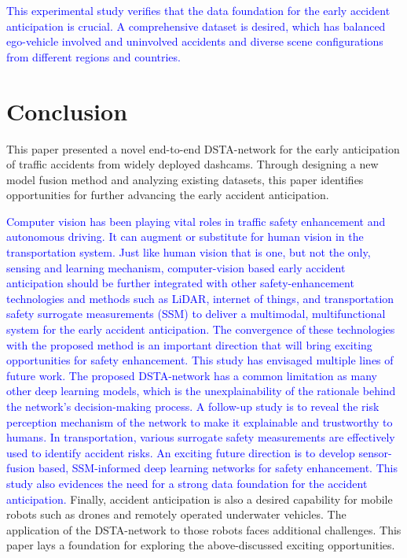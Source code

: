 \documentclass[journal]{IEEEtran}
\begin{document}
\textcolor{blue}{This experimental study verifies that the data foundation for the early accident anticipation is crucial. A comprehensive dataset is desired, which has balanced ego-vehicle involved and uninvolved accidents and diverse scene configurations from different regions and countries.}

\section{Conclusion}

This paper presented a novel end-to-end DSTA-network for the early anticipation of traffic accidents from widely deployed dashcams. Through designing a new model fusion method and analyzing existing datasets, this paper identifies opportunities for further advancing the early accident anticipation. 

\textcolor{blue}{Computer vision has been playing vital roles in traffic safety enhancement and autonomous driving. It can augment or substitute for human vision in the transportation system. Just like human vision that is one, but not the only, sensing and learning mechanism, computer-vision based early accident anticipation should be further integrated with other safety-enhancement technologies and methods such as LiDAR, internet of things, and transportation safety surrogate measurements (SSM) to deliver a multimodal, multifunctional system for the early accident anticipation. The convergence of these technologies with the proposed method is an important direction that will bring exciting opportunities for safety enhancement. This study has envisaged multiple lines of future work. The proposed DSTA-network has a common limitation as many other deep learning models, which is the unexplainability of the rationale behind the network's decision-making process. A follow-up study is to reveal the risk perception mechanism of the network to make it explainable and trustworthy to humans. In transportation, various surrogate safety measurements are effectively used to identify accident risks. An exciting future direction is to develop sensor-fusion based, SSM-informed deep learning networks for safety enhancement. This study also evidences the need for a strong data foundation for the accident anticipation.} Finally, accident anticipation is also a desired capability for mobile robots such as drones and remotely operated underwater vehicles. The application of the DSTA-network to those robots faces additional challenges. This paper lays a foundation for exploring the above-discussed exciting opportunities. 
\end{document}
